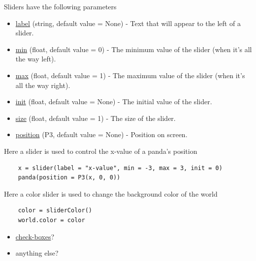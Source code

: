 \documentclass[10pt]{article}
\begin{document}
Sliders have the following parameters
\begin{itemize}
    \item \underline{label} (string, default value = None) - Text that will appear to the left of a slider.
    \item \underline{min} (float, default value = 0) - The minimum value of the slider (when it's all the way left).
    \item \underline{max} (float, default value = 1) - The maximum value of the slider (when it's all the way right).
    \item \underline{init} (float, default value = None) - The initial value of the slider.
    \item \underline{size} (float, default value = 1) - The size of the slider.
    \item \underline{position} (P3, default value = None) - Position on screen.
\end{itemize}
Here a slider is used to control the x-value of a panda's position
\begin{lstlisting}
    x = slider(label = "x-value", min = -3, max = 3, init = 0)
    panda(position = P3(x, 0, 0))
\end{lstlisting}
Here a color slider is used to change the background color of the world
\begin{lstlisting}
    color = sliderColor()
    world.color = color
\end{lstlisting}
\begin{itemize}
    \item \underline{check-boxes}?
    \item anything else?
\end{itemize}
\end{document}
